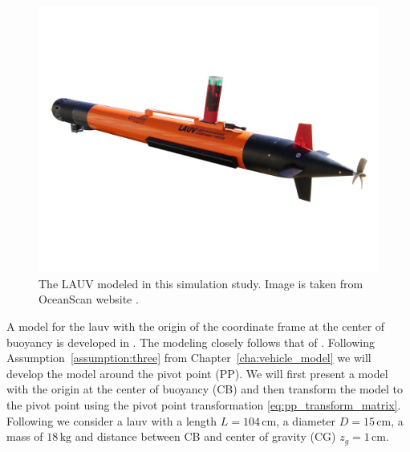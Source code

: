 \begin{figure}[htb]
    \centering
    \includegraphics[width=.7\textwidth, trim={0cm 8.1cm 0cm 8cm}, clip]{figures/lauv-square-00.jpg}
    \vspace{-2mm}
    \caption{The LAUV modeled in this simulation study. Image is taken from OceanScan website \citep{noauthor_lauv_nodate}.}
    \label{fig:lauv}
\end{figure}
\vspace{-2mm}
A model for the \gls{lauv} with the origin of the coordinate frame at the center of buoyancy is developed in \cite{estrela_da_silva_modeling_2007}. The modeling closely follows that of \cite[Section 8.4]{fossen_handbook_2021}. Following Assumption~\ref{assumption:three} from Chapter~\ref{cha:vehicle_model} we will develop the model around the pivot point (PP). We will first present a model with the origin at the center of buoyancy (CB) and then transform the model to the pivot point using the pivot point transformation \eqref{eq:pp_transform_matrix}. Following \cite{estrela_da_silva_modeling_2007} we consider a \gls{lauv} with a length $L = 104\, \mathrm{cm}$, a diameter $D = 15\, \mathrm{cm}$, a mass of $18\, \mathrm{kg}$ and distance between CB and center of gravity (CG) $z_g = 1\, \mathrm{cm}$.

